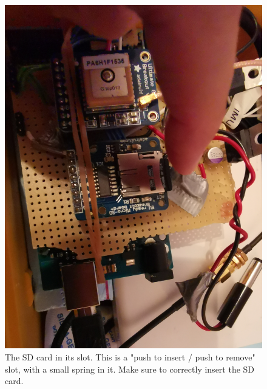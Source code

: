 \documentclass[pdftex,a4paper,12pt,twocolumn,fleqn,captions=tableheading]{scrartcl}
\begin{document}
  \begin{figure}
  \begin{center}
  \includegraphics[width=.8\textwidth]{Figures/sd_card_slot}
  \caption{The SD card in its slot. This is a "push to insert / push to remove" slot, with a small spring in it. Make sure to correctly insert the SD card.}
  \end{center}
  \end{figure}
\end{document}
